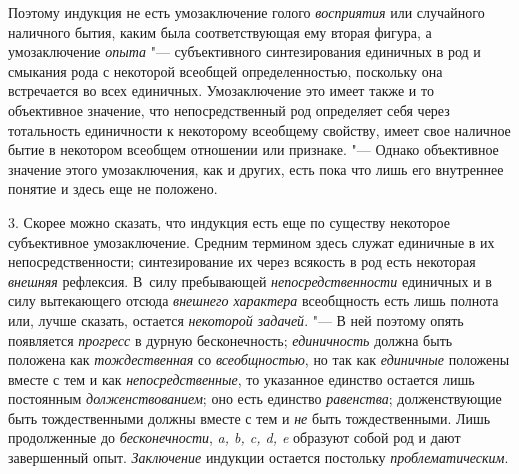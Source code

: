 {{Поэтому индукция не есть умозаключение голого
{\em восприятия} или
случайного наличного бытия, каким была соответствующая ему вторая фигура, а
умозаключение {\em опыта}
"--- субъективного синтезирования единичных в род и смыкания
рода с некоторой всеобщей определенностью, поскольку она встречается во
всех единичных. Умозаключение это имеет также и то объективное значение,
что непосредственный род определяет себя через тотальность единичности к
некоторому всеобщему свойству, имеет свое наличное бытие в некотором
всеобщем отношении или признаке. "--- Однако объективное
значение этого умозаключения, как и других, есть пока что лишь его
внутреннее понятие и здесь еще не положено.

3. Скорее можно сказать, что индукция есть еще по существу
некоторое субъективное умозаключение. Средним термином здесь служат
единичные в их непосредственности; синтезирование их через всякость в род
есть некоторая {\em внешняя}
рефлексия. В~силу пребывающей
{\em непосредственности}
единичных и в силу вытекающего отсюда
{\em внешнего характера}
всеобщность есть лишь полнота или, лучше
сказать, остается {\em некоторой
задачей}. "--- В ней поэтому опять появляется
{\em прогресс} в дурную
бесконечность; {\em единичность}
должна быть положена как
{\em тождественная} со
{\em всеобщностью}, но
так как {\em единичные}
положены вместе с тем и как
{\em непосредственные},
то указанное единство остается лишь постоянным
{\em долженствованием};
оно есть единство
{\em равенства};
долженствующие быть тождественными должны вместе с тем и
{\em не} быть
тождественными. Лишь продолженные до
{\em бесконечности},
{\em a, b, c, d, e} образуют собой род и
дают завершенный опыт. {\em Заключение}
индукции остается постольку
{\em проблематическим}.

}}
